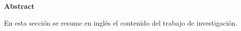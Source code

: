 \thispagestyle{plain}
\begin{center}
    \Large    
    \vspace{0.9cm}
    \textbf{Abstract}
\end{center}
En esta sección se resume en inglés el contenido del trabajo de investigación.